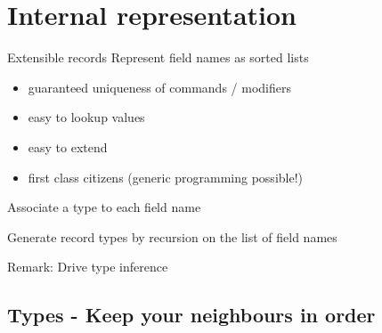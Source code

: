 \documentclass[dvipsnames]{beamer}
\begin{document}
\section{Internal representation}
\begin{frame}{Extensible records}
 Represent field names as sorted lists
  \begin{itemize}
    \item guaranteed uniqueness of commands / modifiers
    \item easy to lookup values
    \item easy to extend
    \item first class citizens (generic programming possible!)
  \end{itemize}
 Associate a type to each field name

 Generate record types by recursion on the list of field names

 Remark: Drive type inference
\end{frame}

\subsection{Types - Keep your neighbours in order}
\end{document}
